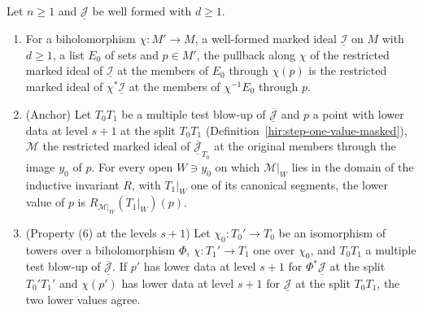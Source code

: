 \begin{lemma}
\label{bcalc:member-restrict-tower-iso}
\leanok
Let \(n\ge1\) and \(\underline{\mathcal J}\) be well formed with \(d\ge1\).
\begin{enumerate}
\item For a biholomorphism \(\chi\colon M'\to M\), a well-formed marked ideal \(\underline{\mathcal I}\) on \(M\) with \(d\ge1\), a list \(E_0\) of sets and \(p\in M'\), the
pullback along \(\chi\) of the restricted marked ideal of \(\underline{\mathcal I}\) at the members of \(E_0\) through \(\chi(p)\) is the restricted marked ideal of
\(\chi^*\underline{\mathcal I}\) at the members of \(\chi^{-1}E_0\) through \(p\).
\item (Anchor) Let \(T_0T_1\) be a multiple test blow-up of \(\overline{\underline{\mathcal J}}\) and \(p\) a point with lower data at level \(s+1\) at the split \(T_0T_1\)
(Definition~\ref{hir:step-one-value-masked}), \(\mathcal M\) the restricted marked ideal of \(\overline{\underline{\mathcal J}}_{T_0}\) at the original members through the image
\(y_0\) of \(p\). For every open \(W\ni y_0\) on which \(\mathcal M|_W\) lies in the domain of the inductive invariant \(R\), with \(T_1|_W\) one of its canonical segments, the
lower value of \(p\) is \(R_{\mathcal M|_W}(T_1|_W)(p)\).
\item (Property (6) at the levels \(s+1\)) Let \(\chi_0\colon T_0'\to T_0\) be an isomorphism of towers over a biholomorphism \(\Phi\), \(\chi\colon T_1'\to T_1\) one over
\(\chi_0\), and \(T_0T_1\) a multiple test blow-up of \(\overline{\underline{\mathcal J}}\). If \(p'\) has lower data at level \(s+1\) for \(\Phi^*\underline{\mathcal J}\) at the split
\(T_0'T_1'\) and \(\chi(p')\) has lower data at level \(s+1\) for \(\underline{\mathcal J}\) at the split \(T_0T_1\), the two lower values agree.
\end{enumerate}
\end{lemma}
